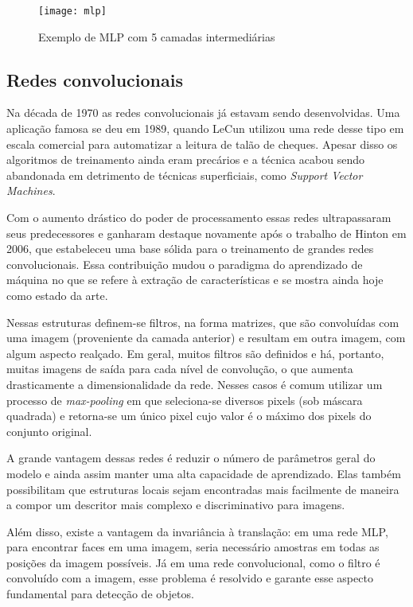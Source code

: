 \begin{figure}[h]
\caption{Exemplo de MLP com 5 camadas intermediárias}
\centering
\texttt{[image: mlp]}
\label{fig:mlp}
\end{figure}

\subsection{Redes convolucionais}
Na década de 1970 as redes convolucionais já estavam sendo desenvolvidas. Uma aplicação famosa se deu em 1989, quando LeCun utilizou uma rede desse tipo em escala comercial para automatizar a leitura de talão de cheques. Apesar disso os algoritmos de treinamento ainda eram precários e a técnica acabou sendo abandonada em detrimento de técnicas superficiais, como \textit{Support Vector Machines}.

Com o aumento drástico do poder de processamento essas redes ultrapassaram seus predecessores e ganharam destaque novamente após o trabalho de Hinton \cite{hintonDL} em 2006, que estabeleceu uma base sólida para o treinamento de grandes redes convolucionais. Essa contribuição mudou o paradigma do aprendizado de máquina no que se refere à extração de características e se mostra ainda hoje como estado da arte. 

Nessas estruturas definem-se filtros, na forma matrizes, que são convoluídas com uma imagem (proveniente da camada anterior) e resultam em outra imagem, com algum aspecto realçado. Em geral, muitos filtros são definidos e há, portanto, muitas imagens de saída para cada nível de convolução, o que aumenta drasticamente a dimensionalidade da rede. Nesses casos é comum utilizar um processo de \textit{max-pooling} em que seleciona-se diversos pixels (sob máscara quadrada) e retorna-se um único pixel cujo valor é o máximo dos pixels do conjunto original.

A grande vantagem dessas redes é reduzir o número de parâmetros geral do modelo e ainda assim manter uma alta capacidade de aprendizado. Elas também possibilitam que estruturas locais sejam encontradas mais facilmente de maneira a compor um descritor mais complexo e discriminativo para imagens.

Além disso, existe a vantagem da invariância à translação: em uma rede MLP, para encontrar faces em uma imagem, seria necessário amostras em todas as posições da imagem possíveis. Já em uma rede convolucional, como o filtro é convoluído com a imagem, esse problema é resolvido e garante esse aspecto fundamental para detecção de objetos.

